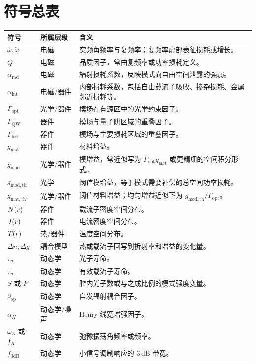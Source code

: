 \section{符号总表}
\begin{longtable}{@{}p{}p{}p{}@{}}
\toprule
符号 & 所属层级 & 含义 \\
\midrule
\endhead
$\omega,\tilde{\omega}$ & 电磁 & 实频角频率与复频率；复频率虚部表征损耗或增长。 \\
$Q$ & 电磁 & 品质因子，常由复频率或功率损耗定义。 \\
$\alpha_\mathrm{rad}$ & 电磁 & 辐射损耗系数，反映模式向自由空间泄露的强弱。 \\
$\alpha_\mathrm{int}$ & 电磁/器件 & 内部损耗系数，包括自由载流子吸收、掺杂损耗、金属邻近损耗等。 \\
$\Gamma_\mathrm{opt}$ & 光学/器件 & 模场在有源区中的光学约束因子。 \\
$\Gamma_\mathrm{QW}$ & 器件 & 模场与量子阱区域的重叠因子。 \\
$\Gamma_\mathrm{loss}$ & 器件 & 模场与主要损耗区域的重叠因子。 \\
$g_\mathrm{mat}$ & 器件 & 材料增益。 \\
$g_\mathrm{mod}$ & 光学/器件 & 模增益，常近似写为 $\Gamma_\mathrm{opt} g_\mathrm{mat}$ 或更精细的空间积分形式。 \\
$g_\mathrm{mod,th}$ & 光学 & 阈值模增益，等于模式需要补偿的总空间功率损耗。 \\
$g_\mathrm{mat,th}$ & 光学/器件 & 阈值材料增益；均匀增益近似下为 $g_\mathrm{mod,th}/\Gamma_\mathrm{opt}$。 \\
$N(r)$ & 器件 & 载流子密度空间分布。 \\
$J(r)$ & 器件 & 电流密度空间分布。 \\
$T(r)$ & 热/器件 & 温度空间分布。 \\
$\Delta n,\Delta g$ & 耦合模型 & 热或载流子回写到折射率和增益的变化量。 \\
$\tau_p$ & 动态学 & 光子寿命。 \\
$\tau_n$ & 动态学 & 有效载流子寿命。 \\
$S$ 或 $P$ & 动态学 & 腔内光子数或与之成比例的模式强度变量。 \\
$\beta_\mathrm{sp}$ & 动态学 & 自发辐射耦合因子。 \\
$\alpha_H$ & 动态学/噪声 & Henry 线宽增强因子。 \\
$\omega_R$ 或 $f_R$ & 动态学 & 弛豫振荡角频率或频率。 \\
$f_{3\mathrm{dB}}$ & 动态学 & 小信号调制响应的 $3\,\mathrm{dB}$ 带宽。 \\

\end{longtable}
